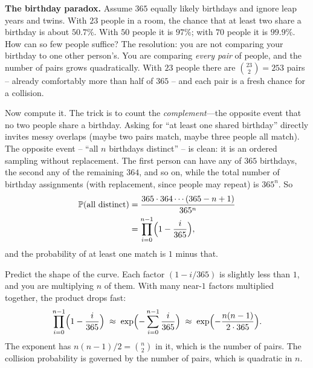 \begin{paradoxbox}
\textbf{The birthday paradox.} Assume $365$ equally likely birthdays and ignore leap years
and twins. With $23$ people in a room, the chance that at least two share a birthday is
about $50.7\%$. With $50$ people it is $97\%$; with $70$ people it is $99.9\%$. How can so
few people suffice? The resolution: you are not comparing your birthday to one other
person's. You are comparing \emph{every pair} of people, and the number of pairs grows
quadratically. With $23$ people there are $\binom{23}{2} = 253$ pairs -- already comfortably
more than half of $365$ -- and each pair is a fresh chance for a collision.
\end{paradoxbox}

Now compute it. The trick is to count the \emph{complement}---the opposite event that
no two people share a birthday. Asking for ``at least one shared birthday'' directly invites
messy overlaps (maybe two pairs match, maybe three people all match). The opposite event --
``all $n$ birthdays distinct'' -- is clean: it is an ordered sampling without replacement.
The first person can have any of $365$ birthdays, the second any of the remaining $364$,
and so on, while the total number of birthday assignments (with replacement, since people may
repeat) is $365^n$. So
\begin{align*}
  \P(\text{all distinct})
  &= \frac{365 \cdot 364 \cdots (365 - n + 1)}{365^n} \\
  &= \prod_{i=0}^{n-1}\Bigl(1 - \frac{i}{365}\Bigr),
\end{align*}
and the probability of at least one match is $1$ minus that.

\begin{walkbox}
Predict the shape of the curve. Each factor $(1 - i/365)$ is slightly
less than $1$, and you are multiplying $n$ of them. With many near-$1$ factors multiplied
together, the product drops fast:
\[
  \prod_{i=0}^{n-1} \Bigl(1 - \frac{i}{365}\Bigr) \;\approx\; \exp\Bigl(-\sum_{i=0}^{n-1} \frac{i}{365}\Bigr) \;\approx\; \exp\Bigl(-\frac{n(n-1)}{2 \cdot 365}\Bigr).
\]
The exponent has $n(n-1)/2 = \binom{n}{2}$ in it, which is the number of pairs. The collision probability is governed by the number of pairs,
which is quadratic in $n$.
\end{walkbox}

